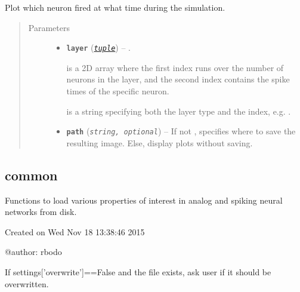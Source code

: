 \documentclass[letterpaper,10pt,english]{sphinxmanual}
\begin{document}
\begin{fulllineitems}
\label{snntoolbox.io_utils:snntoolbox.io_utils.plotting.plot_spiketrains}
Plot which neuron fired at what time during the simulation.
\begin{quote}\begin{description}
\item[{Parameters}] \leavevmode\begin{itemize}
\item {} 
\textbf{\texttt{layer}} (\href{https://docs.python.org/library/functions.html\#tuple}{\emph{\texttt{tuple}}}) -- 
.

 is a 2D array where the first index runs over the number
of neurons in the layer, and the second index contains the spike times
of the specific neuron.

 is a string specifying both the layer type and the index,
e.g. .


\item {} 
\textbf{\texttt{path}} (\emph{\texttt{string, optional}}) -- If not , specifies where to save the resulting image. Else,
display plots without saving.

\end{itemize}

\end{description}\end{quote}

\end{fulllineitems}



\subsection{common}
\label{snntoolbox.io_utils:common}\label{snntoolbox.io_utils:module-snntoolbox.io_utils.common}
Functions to load various properties of interest in analog and spiking neural
networks from disk.

Created on Wed Nov 18 13:38:46 2015

@author: rbodo

\begin{fulllineitems}
\label{snntoolbox.io_utils:snntoolbox.io_utils.common.confirm_overwrite}
If settings{[}'overwrite'{]}==False and the file exists, ask user if it should
be overwritten.

\end{fulllineitems}
\end{document}

